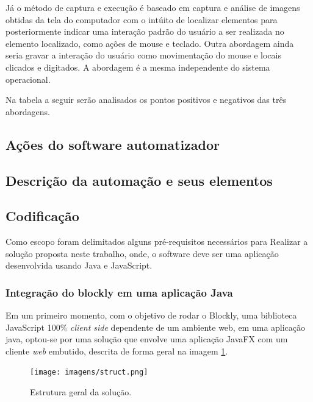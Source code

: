 \documentclass[tg]{mdtufsm}
\begin{document}
                Já o método de captura e execução é baseado em captura e análise de imagens obtidas da tela do computador com o intúito de localizar elementos para posteriormente indicar uma interação padrão do usuário a ser realizada no elemento localizado, como ações de mouse e teclado. Outra abordagem ainda seria gravar a interação do usuário como movimentação do mouse e locais clicados e digitados. A abordagem é a mesma independente do sistema operacional.

                Na tabela a seguir serão analisados os pontos positivos e negativos das três abordagens.



            \subsection {Ações do software automatizador}

            \subsection {Descrição da automação e seus elementos}



            \subsection {Codificação}

                Como escopo foram delimitados alguns pré-requisitos necessários para Realizar a solução proposta neste trabalho, onde, o software deve ser uma aplicação desenvolvida usando Java e JavaScript.

                \subsubsection {Integração do blockly em uma aplicação Java}

                    Em um primeiro momento, com o objetivo de rodar o Blockly, uma biblioteca JavaScript 100\% \emph{client side} dependente de um ambiente web, em uma aplicação java, optou-se por uma solução que envolve uma aplicação JavaFX com um cliente \emph{web} embutido, descrita de forma geral na imagem \ref{fig:struct}.

                    \begin{figure}[!htb]
                        {\centering
                        \texttt{[image: imagens/struct.png]}
                        \caption{Estrutura geral da solução.}
                        \label{fig:struct}}
                    \end{figure}
\end{document}
